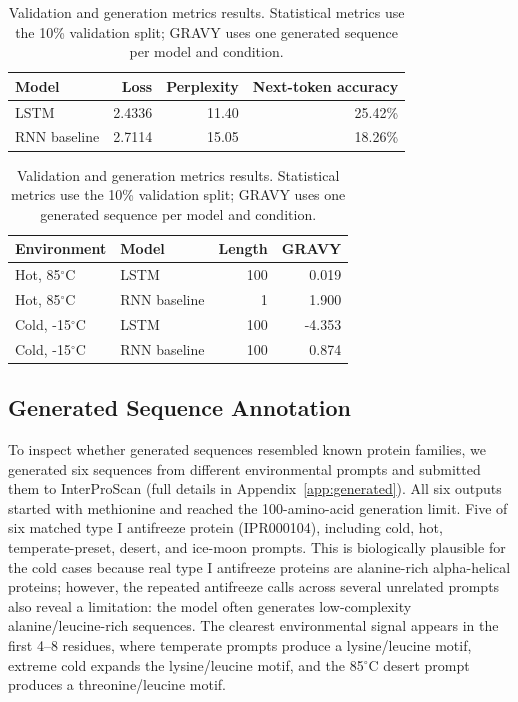 \documentclass[11pt]{article}
\begin{document}
\begin{table}[H]
\centering
\caption{Validation and generation metrics results. Statistical metrics use the 10\%
validation split; GRAVY uses one generated sequence per model and condition.}
\label{tab:baseline}
\begin{tabular}{lrrr}
\toprule
Model & Loss & Perplexity & Next-token accuracy \\
\midrule
LSTM & 2.4336 & 11.40 & 25.42\% \\
RNN baseline & 2.7114 & 15.05 & 18.26\% \\
\bottomrule
\end{tabular}

\vspace{0.5em}
\begin{tabular}{llrr}
\toprule
Environment & Model & Length & GRAVY \\
\midrule
Hot, 85$^\circ$C & LSTM & 100 & 0.019 \\
Hot, 85$^\circ$C & RNN baseline & 1 & 1.900 \\
Cold, -15$^\circ$C & LSTM & 100 & -4.353 \\
Cold, -15$^\circ$C & RNN baseline & 100 & 0.874 \\
\bottomrule
\end{tabular}
\end{table}

\subsection{Generated Sequence Annotation}
To inspect whether generated sequences resembled known protein families, we
generated six sequences from different environmental prompts and submitted them
to InterProScan (full details in Appendix~\ref{app:generated}). All six outputs
started with methionine and reached the 100-amino-acid generation limit. Five
of six matched type I antifreeze protein (IPR000104), including cold, hot,
temperate-preset, desert, and ice-moon prompts. This is biologically plausible
for the cold cases because real type I antifreeze proteins are alanine-rich
alpha-helical proteins; however, the repeated antifreeze calls across several
unrelated prompts also reveal a limitation: the model often generates
low-complexity alanine/leucine-rich sequences. The clearest environmental signal
appears in the first 4--8 residues, where temperate prompts produce a
lysine/leucine motif, extreme cold expands the lysine/leucine motif, and the
85$^\circ$C desert prompt produces a threonine/leucine motif.
\end{document}
